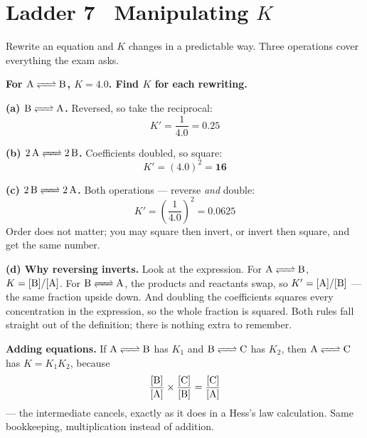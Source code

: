 \documentclass{apchem-worksheet}
\begin{document}
\section*{\sffamily Ladder 7 \textbullet\ Manipulating $K$}

Rewrite an equation and $K$ changes in a predictable way. Three
operations cover everything the exam asks.

\begin{center}
\end{center}

\begin{workedexample}
\textbf{For $\ce{A <=> B}$, $K = 4.0$. Find $K$ for each rewriting.}

\textbf{(a) $\ce{B <=> A}$.} Reversed, so take the reciprocal:
\[ K' = \frac{1}{4.0} = \mathbf{0.25} \]

\textbf{(b) $\ce{2A <=> 2B}$.} Coefficients doubled, so square:
\[ K' = (4.0)^{2} = \mathbf{16} \]

\textbf{(c) $\ce{2B <=> 2A}$.} Both operations --- reverse
\emph{and} double:
\[ K' = \left(\frac{1}{4.0}\right)^{2} = \mathbf{0.0625} \]
Order does not matter; you may square then invert, or invert then
square, and get the same number.

\textbf{(d) Why reversing inverts.} Look at the expression.
For $\ce{A <=> B}$, $K = [\ce{B}]/[\ce{A}]$. For $\ce{B <=> A}$, the
products and reactants swap, so $K' = [\ce{A}]/[\ce{B}]$ --- the same
fraction upside down. And doubling the coefficients squares every
concentration in the expression, so the whole fraction is squared. Both
rules fall straight out of the definition; there is nothing extra to
remember.

\textbf{Adding equations.} If $\ce{A <=> B}$ has $K_{1}$ and
$\ce{B <=> C}$ has $K_{2}$, then $\ce{A <=> C}$ has
$K = K_{1}K_{2}$, because
\[ \frac{[\ce{B}]}{[\ce{A}]} \times \frac{[\ce{C}]}{[\ce{B}]}
   = \frac{[\ce{C}]}{[\ce{A}]} \]
--- the intermediate cancels, exactly as it does in a Hess's law
calculation. Same bookkeeping, multiplication instead of addition.
\end{workedexample}
\end{document}
